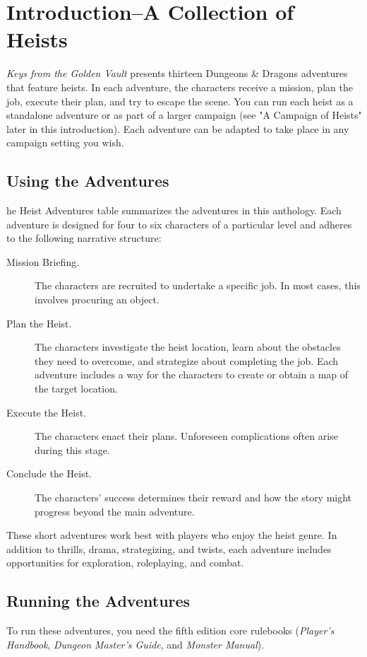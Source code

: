 \documentclass[10pt,a4paper,twoside,bg=print,twocolumn,openany,nodeprecatedcode]{dndbook}
\date{}
\begin{document}
\frontmatter
\tableofcontents
\mainmatter
{}
\chapter*{Introduction–A Collection of Heists}
\textit{Keys from the Golden Vault} presents thirteen Dungeons \& Dragons adventures that feature heists. In each adventure, the characters receive a mission, plan the job, execute their plan, and try to escape the scene. You can run each heist as a standalone adventure or as part of a larger campaign (see "A Campaign of Heists" later in this introduction). Each adventure can be adapted to take place in any campaign setting you wish.

\section{Using the Adventures}
he Heist Adventures table summarizes the adventures in this anthology. Each adventure is designed for four to six characters of a particular level and adheres to the following narrative structure:



\begin{description}
\item[Mission Briefing.]
The characters are recruited to undertake a specific job. In most cases, this involves procuring an object.
\item[Plan the Heist.]
The characters investigate the heist location, learn about the obstacles they need to overcome, and strategize about completing the job. Each adventure includes a way for the characters to create or obtain a map of the target location.
\item[Execute the Heist.]
The characters enact their plans. Unforeseen complications often arise during this stage.
\item[Conclude the Heist.]
The characters' success determines their reward and how the story might progress beyond the main adventure.
\end{description}

These short adventures work best with players who enjoy the heist genre. In addition to thrills, drama, strategizing, and twists, each adventure includes opportunities for exploration, roleplaying, and combat.

\section{Running the Adventures}
To run these adventures, you need the fifth edition core rulebooks (\textit{Player's Handbook}, \textit{Dungeon Master's Guide}, and \textit{Monster Manual}).
\end{document}
